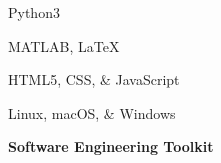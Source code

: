 \documentclass[letterpaper,final]{memoir}
\newcommand{\Sep}{\vspace{1.0em}}
\newcommand{\CVItem}[1]
	{\textbf{\color{Blue} #1}}
\begin{document}
\begin{multicols}{1}

    \begin{compactitem}[\color{Blue}$\circ$]
		
		\item Python3
       

        \item MATLAB, LaTeX
		

        \item HTML5, CSS, \& JavaScript
        

        \item Linux, macOS, \& Windows
       
    
	\end{compactitem}

\end{multicols}

\Sep

\CVItem{Software Engineering Toolkit}
\Sep
\end{document}

